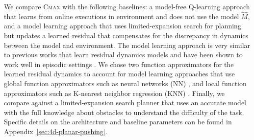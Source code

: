 We compare \textsc{Cmax} with
the following baselines: a
model-free Q-learning approach
\cite{DBLP:journals/nature/MnihKSRVBGRFOPB15} that learns from
online executions in environment
and does not use the model $\hat{M}$, and a model learning approach that uses
limited-expansion search for planning but updates a learned residual that
compensates for the discrepancy in dynamics between the model and
environment. The model learning approach is very similar to previous works
that learn residual dynamics models and have been shown to work well in
episodic settings \cite{rastogi2018sample, DBLP:conf/icra/HaY15,
  DBLP:conf/iros/SaverianoYFL17}. We chose two function
approximators for the learned residual dynamics to account for
model learning approaches that use global function
approximators such as neural networks (NN)
\cite{DBLP:conf/nips/JannerFZL19}, and local function approximators
such as K-nearest neighbor regression (KNN)
\cite{DBLP:conf/nips/NouriL08, DBLP:conf/atal/JongS07}. Finally, we compare against
a limited-expansion search planner that uses an accurate model with
the full knowledge about
obstacles to understand the
difficulty of the task. Specific details on the architecture and baseline
parameters can be found in Appendix~\ref{sec:4d-planar-pushing}.

